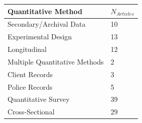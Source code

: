 \documentclass[]{tufte-handout}
\begin{document}
\begin{longtable}[]{@{}ll@{}}
\toprule
\begin{minipage}[b]{0.42\columnwidth}\raggedright\strut
Quantitative Method\strut
\end{minipage} & \begin{minipage}[b]{0.21\columnwidth}\raggedright\strut
\(N_{Articles}\)\strut
\end{minipage}\tabularnewline
\midrule
\endhead
\begin{minipage}[t]{0.42\columnwidth}\raggedright\strut
Secondary/Archival Data\strut
\end{minipage} & \begin{minipage}[t]{0.21\columnwidth}\raggedright\strut
10\strut
\end{minipage}\tabularnewline
\begin{minipage}[t]{0.42\columnwidth}\raggedright\strut
Experimental Design\strut
\end{minipage} & \begin{minipage}[t]{0.21\columnwidth}\raggedright\strut
13\strut
\end{minipage}\tabularnewline
\begin{minipage}[t]{0.42\columnwidth}\raggedright\strut
Longitudinal\strut
\end{minipage} & \begin{minipage}[t]{0.21\columnwidth}\raggedright\strut
12\strut
\end{minipage}\tabularnewline
\begin{minipage}[t]{0.42\columnwidth}\raggedright\strut
Multiple Quantitative Methods\strut
\end{minipage} & \begin{minipage}[t]{0.21\columnwidth}\raggedright\strut
2\strut
\end{minipage}\tabularnewline
\begin{minipage}[t]{0.42\columnwidth}\raggedright\strut
Client Records\strut
\end{minipage} & \begin{minipage}[t]{0.21\columnwidth}\raggedright\strut
3\strut
\end{minipage}\tabularnewline
\begin{minipage}[t]{0.42\columnwidth}\raggedright\strut
Police Records\strut
\end{minipage} & \begin{minipage}[t]{0.21\columnwidth}\raggedright\strut
5\strut
\end{minipage}\tabularnewline
\begin{minipage}[t]{0.42\columnwidth}\raggedright\strut
Quantitative Survey\strut
\end{minipage} & \begin{minipage}[t]{0.21\columnwidth}\raggedright\strut
39\strut
\end{minipage}\tabularnewline
\begin{minipage}[t]{0.42\columnwidth}\raggedright\strut
Cross-Sectional\strut
\end{minipage} & \begin{minipage}[t]{0.21\columnwidth}\raggedright\strut
29\strut
\end{minipage}\tabularnewline
\bottomrule
\end{longtable}
\end{document}
